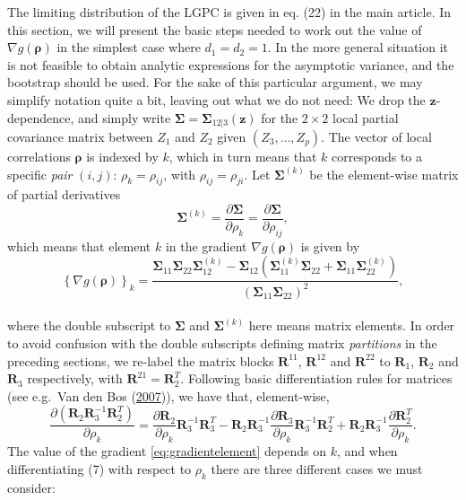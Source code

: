 \documentclass[
  12pt,
  letterpaper]{article}
\numberwithin{equation}{section}
\newcommand{\z}{\bm{z}}
\newcommand{\R}{\bm{R}}
\newcommand{\frho}{\bm{\rho}}
\newcommand{\fSigma}{\bm{\Sigma}}
\begin{document}
The limiting distribution of the LGPC is given in eq. (22) in the main article. In this section, we will present the basic steps needed to work out the value of \(\nabla g(\frho)\) in the simplest case where \(d_1 = d_2=1\). In the more general situation it is not feasible to obtain analytic expressions for the asymptotic variance, and the bootstrap should be used. For the sake of this particular argument, we may simplify notation quite a bit, leaving out what we do not need: We drop the \(\z\)-dependence, and simply write \(\fSigma = \fSigma_{12|3}(\z)\) for the \(2\times2\) local partial covariance matrix between \(Z_1\) and \(Z_2\) given \((Z_3,\ldots,Z_p)\). The vector of local correlations \(\frho\) is indexed by \(k\), which in turn means that \(k\) corresponds to a specific \emph{pair} \((i,j)\): \(\rho_k = \rho_{ij}\), with \(\rho_{ij} = \rho_{ji}\). Let \(\fSigma^{(k)}\) be the element-wise matrix of partial derivatives
\[\fSigma^{(k)} = \frac{\partial \fSigma}{\partial \rho_k} = \frac{\partial \fSigma}{\partial \rho_{ij}},\]
which means that element \(k\) in the gradient \(\nabla g(\frho)\) is given by
\begin{equation}
\left\{\nabla g(\frho) \right\}_k = \frac{\fSigma_{11}\fSigma_{22}\fSigma^{(k)}_{12} - \fSigma_{12}\left(\fSigma_{11}^{(k)}\fSigma_{22} + \fSigma_{11}\fSigma_{22}^{(k)}\right)}{\left(\fSigma_{11}\fSigma_{22}\right)^2},
\label{eq:gradientelement}
\end{equation}\\
where the double subscript to \(\fSigma\) and \(\fSigma^{(k)}\) here means matrix elements. In order to avoid confusion with the double subscripts defining matrix \emph{partitions} in the preceding sections, we re-label the matrix blocks \(\R^{11}\), \(\R^{12}\) and \(\R^{22}\) to \(\R_1\), \(\R_2\) and \(\R_3\) respectively, with \(\R^{21} = \R_2^T\). Following basic differentiation rules for matrices (see e.g.~Van den Bos (\protect\hyperlink{ref-van2007parameter}{2007})), we have that, element-wise,
\begin{equation}
\frac{\partial\left(\R_2\R_3^{-1}\R_2^T\right)}{\partial\rho_k} = \frac{\partial\R_2}{\partial\rho_k}\R_3^{-1}\R_3^T - \R_2\R_3^{-1}\frac{\partial \R_3}{\partial \rho_k}\R_3^{-1}\R_2^T + \R_2\R_3^{-1}\frac{\partial\R_2^T}{\partial\rho_k}.
\label{eq:derivative}
\end{equation}
The value of the gradient \eqref{eq:gradientelement} depends on \(k\), and when differentiating (7) with respect to \(\rho_k\) there are three different cases we must consider:
\end{document}

